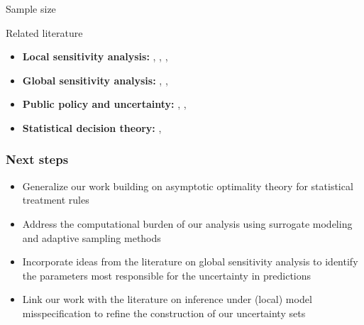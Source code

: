 \begin{frame}{Sample size}
  \begin{figure}
  \end{figure}
\end{frame}
\begin{frame}{Related literature}\vspace{0.3cm}
  	\begin{itemize}\setlength\itemsep{1em}
  	\item \textbf{Local sensitivity analysis:} \citet{Andrews.2017}, \citet{Andrews.2020}, \citet{Christensen.2019}, \citet{Jorgensen.2021}
    \item \textbf{Global sensitivity analysis:} \citet{Cai.2019}, \citet{Harenberg.2019}, \citet{Miftakhova.2021}
    \item \textbf{Public policy and uncertainty:} \citet{Berger.2021}, \citet{Hansen.2021}, \citet{Manski.2013}
    \item \textbf{Statistical decision theory:} \citet{Gilboa.2009}, \citet{Manski.2021}

  	\end{itemize}
\end{frame}
\begin{frame}\frametitle{Next steps}\vspace{0.3cm}

\begin{itemize}\setlength\itemsep{1em}
  \item Generalize our work building on asymptotic optimality theory for statistical treatment rules
  \item Address the computational burden of our analysis using surrogate modeling and adaptive sampling methods
  \item Incorporate ideas from the literature on global sensitivity analysis to identify the parameters most responsible for the uncertainty in predictions
  \item Link our work with the literature on inference under (local) model misspecification to refine the construction of our uncertainty sets
\end{itemize}
\end{frame}
\backupend
